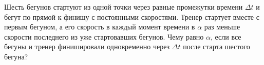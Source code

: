 Шесть бегунов стартуют из одной точки через равные промежутки времени $\Delta t$ и бегут по прямой к финишу с постоянными скоростями. Тренер стартует вместе с первым бегуном, а его скорость в каждый момент времени в $\alpha$ раз меньше скорости последнего из уже стартовавших бегунов. Чему равно $\alpha$, если все бегуны и тренер финишировали одновременно через $\Delta t$ после старта шестого бегуна?
